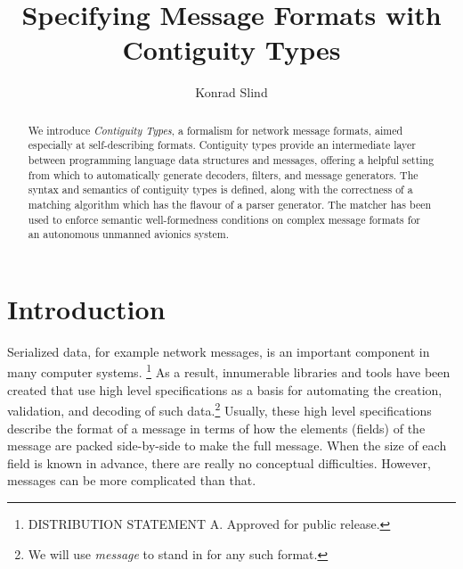 \documentclass[a4paper,UKenglish,cleveref, autoref, thm-restate]{lipics-v2021}
\title{Specifying Message Formats with Contiguity Types} %
\author{Konrad Slind}{Trusted Systems Group, Collins Aerospace, USA}{konrad.slind@collins.com}{}{}
\begin{document}
\maketitle



\begin{abstract}
We introduce \emph{Contiguity Types}, a formalism for network message
formats, aimed especially at self-describing formats. Contiguity types
provide an intermediate layer between programming language data
structures and messages, offering a helpful setting from which to
automatically generate decoders, filters, and message generators.  The
syntax and semantics of contiguity types is defined, along with the
correctness of a matching algorithm which has the flavour of a parser
generator. The matcher has been used to enforce semantic
well-formedness conditions on complex message formats for an
autonomous unmanned avionics system.
\end{abstract}


\section{Introduction}\label{sec:intro}

Serialized data, for example network messages, is an important
component in many computer systems.
\footnote{DISTRIBUTION STATEMENT A. Approved for public
release.}
As a result, innumerable libraries and tools have been created that
use high level specifications as a basis for automating the creation,
validation, and decoding of such data.\footnote{We will use
  \emph{message} to stand in for any such format.} Usually, these high
level specifications describe the format of a message in terms of how
the elements (fields) of the message are packed side-by-side to make
the full message. When the size of each field is known in advance,
there are really no conceptual difficulties. However, messages can be
more complicated than that.
\end{document}
